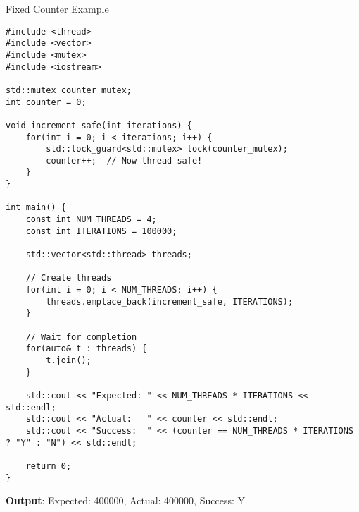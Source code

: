 \begin{frame}[fragile]{ Fixed Counter Example}
	\begin{verbatim}
#include <thread>
#include <vector>
#include <mutex>
#include <iostream>

std::mutex counter_mutex;
int counter = 0;

void increment_safe(int iterations) {
    for(int i = 0; i < iterations; i++) {
        std::lock_guard<std::mutex> lock(counter_mutex);
        counter++;  // Now thread-safe!
    }
}

int main() {
    const int NUM_THREADS = 4;
    const int ITERATIONS = 100000;

    std::vector<std::thread> threads;

    // Create threads
    for(int i = 0; i < NUM_THREADS; i++) {
        threads.emplace_back(increment_safe, ITERATIONS);
    }

    // Wait for completion
    for(auto& t : threads) {
        t.join();
    }

    std::cout << "Expected: " << NUM_THREADS * ITERATIONS << std::endl;
    std::cout << "Actual:   " << counter << std::endl;
    std::cout << "Success:  " << (counter == NUM_THREADS * ITERATIONS ? "Y" : "N") << std::endl;

    return 0;
}
	\end{verbatim}

	\textbf{Output}: Expected: 400000, Actual: 400000, Success: Y
\end{frame}

